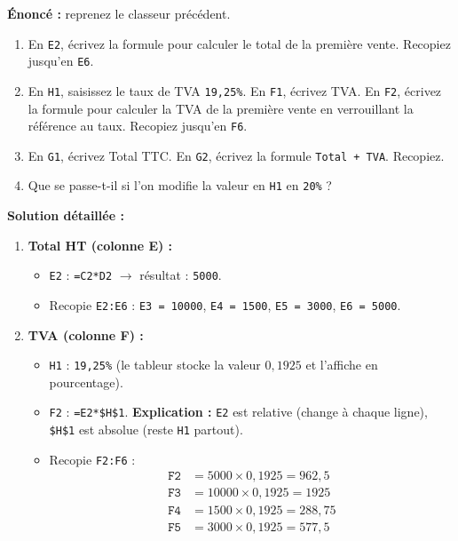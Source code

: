\documentclass[11pt]{article}
\begin{document}
\begin{exoresolu}
\textbf{Énoncé :} reprenez le classeur précédent.
\begin{enumerate}
    \item En \texttt{E2}, écrivez la formule pour calculer le total de la première vente. Recopiez jusqu'en \texttt{E6}.
    \item En \texttt{H1}, saisissez le taux de TVA \texttt{19,25\%}. En \texttt{F1}, écrivez \og{}TVA\fg{}. En \texttt{F2}, écrivez la formule pour calculer la TVA de la première vente en verrouillant la référence au taux. Recopiez jusqu'en \texttt{F6}.
    \item En \texttt{G1}, écrivez \og{}Total TTC\fg{}. En \texttt{G2}, écrivez la formule \texttt{Total + TVA}. Recopiez.
    \item Que se passe-t-il si l'on modifie la valeur en \texttt{H1} en \texttt{20\%} ?
\end{enumerate}
\tcblower
\textbf{Solution détaillée :}
\begin{enumerate}
    \item \textbf{Total HT (colonne E) :}
    \begin{itemize}
        \item \texttt{E2} : \texttt{=C2*D2} $\rightarrow$ résultat : \texttt{5000}.
        \item Recopie \texttt{E2:E6} : \texttt{E3 = 10000}, \texttt{E4 = 1500}, \texttt{E5 = 3000}, \texttt{E6 = 5000}.
    \end{itemize}
    \item \textbf{TVA (colonne F) :}
    \begin{itemize}
        \item \texttt{H1} : \texttt{19,25\%} (le tableur stocke la valeur $0,1925$ et l'affiche en pourcentage).
        \item \texttt{F2} : \texttt{=E2*\$H\$1}. \textbf{Explication :} \texttt{E2} est relative (change à chaque ligne), \texttt{\$H\$1} est absolue (reste \texttt{H1} partout).
        \item Recopie \texttt{F2:F6} :
        \begin{align*}
        \texttt{F2} &= 5000 \times 0,1925 = 962,5 \\
        \texttt{F3} &= 10000 \times 0,1925 = 1925 \\
        \texttt{F4} &= 1500 \times 0,1925 = 288,75 \\
        \texttt{F5} &= 3000 \times 0,1925 = 577,5 \\

\end{align*}
\end{itemize}
\end{enumerate}
\end{exoresolu}
\end{document}
